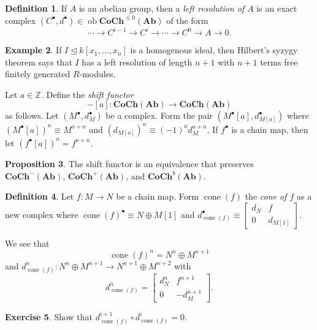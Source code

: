 \documentclass[10pt,letterpaper,cm]{nupset}
\theoremstyle{definition}
\newtheorem{definition}{Definition}[subsection]
\newtheorem{exmp}[definition]{Example}
\theoremstyle{theorem}
\newtheorem{prop}[definition]{Proposition}
\newtheorem{exercise}[definition]{Exercise}
\theoremstyle{remark}
\newcommand{\Z}{\mathbb Z}
\newcommand{\1}{\mathbf{1}}
\newcommand{\0}{\vec 0}
\DeclareMathOperator{\ob}{ob}
\DeclareMathOperator{\cone}{cone}
\begin{document}
\medskip

\begin{definition}
If $A$ is an abelian group, then a \textit{left resolution of $A$} is an exact complex $\left(C^{\bullet}, d^{\bullet}\right) \in \ob{\mathbf{CoCh}^{\leq 0}(\mathbf{Ab})}$  of the form $$\cdots \to C^{i-1} \to C^i \to \cdots \to  C^0 \to A \to 0 .$$
\end{definition}

\begin{exmp}
If $I \unlhd k[x_1, \ldots, x_n]$ is a homogenous ideal, then Hilbert's syzygy theorem says that $I$ has a left resolution of length $n+1$ with $n+1$ terms free finitely generated $R$-modules.
\end{exmp}

\smallskip

Let $a\in \Z$. Define the \textit{shift functor} $${-}[a] : \mathbf{CoCh}(\mathbf{Ab}) \to \mathbf{CoCh}(\mathbf{Ab})$$ as follows. Let $\left(M^{\bullet}, d^{\bullet}_{M}\right)$ be a complex.  Form the pair $\left(M^{\bullet}[a], d^{\bullet}_{M[a]}\right)$ where $\left(M^{\bullet}[a]\right)^n \equiv M^{a+n}$ and $\left(d_{M[a]}\right)^n \equiv ({-1})^a d^{a+n}_M$. If $f^{\bullet}$ is a chain map, then let $\left(f^{\bullet}[a]\right)^n = f^{a+n}$.


\begin{prop}
The shift functor  is an equivalence that preserves $\mathbf{CoCh}^{{-}}(\mathbf{Ab})$, $\mathbf{CoCh}^{+}(\mathbf{Ab})$, and $\mathbf{CoCh}^{b}(\mathbf{Ab})$.
\end{prop}

\begin{definition}
Let $f: M \to N$ be a chain map. Form  $\cone(f)$ the \textit{cone of $f$} as a new complex where $\cone(f)^{\bullet} \equiv N \oplus M[1]$ and $d_{\cone(f)}^{\bullet} \equiv \begin{bmatrix}  d_N & f \\ 0 & d_{M[1]}    \end{bmatrix}.$
\end{definition}


We see that $$\cone(f)^n = N^n \oplus M^{n+1}$$ and $d^n_{\cone(f)} : N^n \oplus M^{n+1} \to N^{n+1} \oplus M^{n+2}$ with $$d^n_{\cone(f)}  = \begin{bmatrix}  d_N^n & f^{n+1} \\ 0 & {-d_M^{n+1}}  \end{bmatrix}.$$


\begin{exercise}
Show that $d^{i+1}_{\cone(f)} \circ d^i_{\cone(f)} =0$.
\end{exercise}
\end{document}
